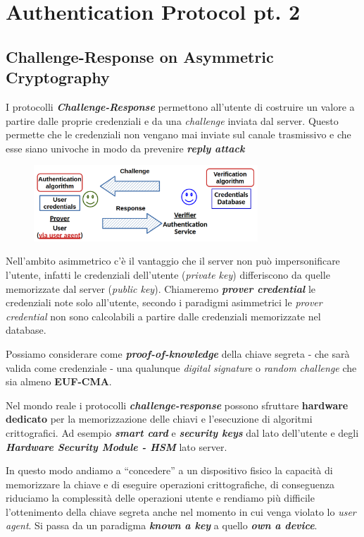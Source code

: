 \chapter{Authentication Protocol pt. 2}

\section{Challenge-Response on Asymmetric Cryptography}

\begin{flushleft}
    I protocolli \textbf{\textit{Challenge-Response}} permettono all'utente di costruire un valore a partire dalle proprie credenziali e da una \textit{challenge} inviata dal server. Questo permette che le credenziali non vengano mai inviate sul canale trasmissivo e che esse siano univoche in modo da prevenire \textbf{\textit{reply attack}}

    \begin{figure}[h]
        \centering
        \includegraphics[width=0.75\textwidth]{img/cr_auth.png}
    \end{figure}

    Nell'ambito asimmetrico c'è il vantaggio che il server non può impersonificare l'utente, infatti le credenziali dell'utente (\textit{private key}) differiscono da quelle memorizzate dal server (\textit{public key}). Chiameremo \textbf{\textit{prover credential}} le credenziali note solo all'utente, secondo i paradigmi asimmetrici le \textit{prover credential} non sono calcolabili a partire dalle credenziali memorizzate nel database.
    
    \smallskip

    Possiamo considerare come \textbf{\textit{proof-of-knowledge}} della chiave segreta - che sarà valida come credenziale - una qualunque \textit{digital signature} o \textit{random challenge} che sia almeno \textbf{EUF-CMA}.

    \medskip

    Nel mondo reale i protocolli \textbf{\textit{challenge-response}} possono sfruttare \textbf{hardware dedicato} per la memorizzazione delle chiavi e l'esecuzione di algoritmi crittografici. Ad esempio \textbf{\textit{smart card}} e \textbf{\textit{security keys}} dal lato dell'utente e degli \textbf{\textit{Hardware Security Module - HSM}} lato server.

    \smallskip

    In questo modo andiamo a ``concedere'' a un dispositivo fisico la capacità di memorizzare la chiave e  di eseguire operazioni crittografiche, di conseguenza riduciamo la complessità delle operazioni utente e rendiamo più difficile l'ottenimento della chiave segreta anche nel momento in cui venga violato lo \textit{user agent}. Si passa da un paradigma \textbf{\textit{known a key}} a quello \textbf{\textit{own a device}}.
\end{flushleft}

